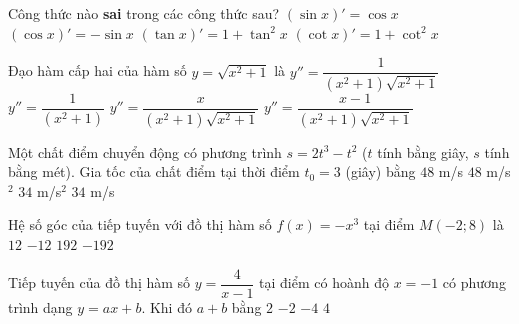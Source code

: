 \begin{ex}%
	Công thức nào \textbf{sai} trong các công thức sau?
	\choice
	{$(\sin x)'=\cos x $}
	{$(\cos x)'=-\sin x $}
	{$(\tan x)'=1+\tan ^2x $}
	{\True $(\cot x)'=1+\cot^2x $}
\end{ex}
\begin{ex}%
	Đạo hàm cấp hai của hàm số $y=\sqrt{x^2+1}$ là
	\choice
	{\True $y''=\dfrac{1}{(x^2+1)\sqrt{x^2+1}} $}
	{$y''=\dfrac{1}{(x^2+1)} $}
	{$y''=\dfrac{x}{(x^2+1)\sqrt{x^2+1}} $}
	{$y''=\dfrac{x-1}{(x^2+1)\sqrt{x^2+1}} $}
\end{ex}
\begin{ex}%
	Một chất điểm chuyển động có phương trình $s=2t^3-t^2$ ($t$ tính bằng giây, $s$ tính bằng mét). Gia tốc của chất điểm tại thời điểm $t_0=3$ (giây) bằng
	\choice
	{$48 $ m/s}
	{$48 $ m/s$^2$}
	{\True $34 $ m/s$^2$}
	{$34$ m/s}
\end{ex}
\begin{ex}%
	Hệ số góc của tiếp tuyến với đồ thị hàm số $f(x)=-x^3$ tại điểm $M(-2;8)$ là
	\choice
	{$12 $}
	{\True $-12 $}
	{$192 $}
	{$-192 $}
\end{ex}
\begin{ex}%
	Tiếp tuyến của đồ thị hàm số $y=\dfrac{4}{x-1}$ tại điểm có hoành độ $x=-1$ có phương trình dạng $y=ax+b$. Khi đó $a+b$ bằng
	\choice
	{$2 $}
	{$-2 $}
	{\True $-4 $}
	{$4 $}
\end{ex}

